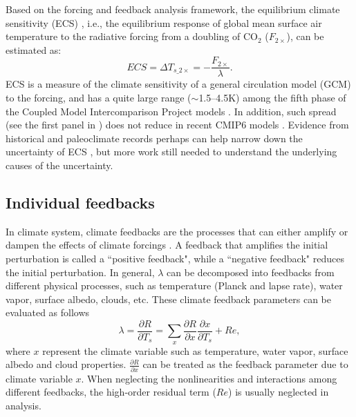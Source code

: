 Based on the forcing and feedback analysis framework, the equilibrium climate sensitivity (ECS) , i.e., the equilibrium response of global mean surface air temperature to the radiative forcing from a doubling of CO$_2$ ($F_{2\times}$), can be estimated as:
\begin{equation}
    ECS = \Delta T_{s\_2\times}=-\frac{F_{2\times}}{\lambda}.
    \label{eq:ecs}
\end{equation}
ECS is a measure of the climate sensitivity of a general circulation model (GCM) to the forcing, and has a quite large range ($\sim$1.5--4.5K) among the fifth phase of the Coupled Model Intercomparison Project \citep[CMIP5;][]{Taylor2012overview} models \citep[e.g.,][]{Andrews2012forcing,Ceppi2017}. In addition, such spread (see the first panel in ) does not reduce in recent CMIP6 \citep{Eyring2016overview} models  \citep{Zelinka2020causes}. Evidence from historical and paleoclimate records perhaps can help narrow down the uncertainty of ECS \citep{Sherwood2020}, but more work still needed to understand the underlying causes of the uncertainty.

\subsection{Individual feedbacks}
\label{sec:individual_fbks}

In climate system, climate feedbacks are the processes that can either amplify or dampen the effects of climate forcings \citep{Hansen1984}. A feedback that amplifies the initial perturbation is called a ``positive feedback", while a ``negative feedback" reduces the initial perturbation. In general, $\lambda$ can be decomposed into feedbacks from different physical processes, such as temperature (Planck and lapse rate), water vapor, surface albedo, clouds, etc. These climate feedback parameters can be evaluated as follows
\begin{equation}
    \lambda = \frac{\partial R}{\partial T_s} = \sum_x \frac{\partial R}{\partial x}\frac{\partial x}{\partial T_s} + Re, %
    \label{eq:lambda_sum}
\end{equation}
where $x$ represent the climate variable such as temperature, water vapor, surface albedo and cloud properties. $\frac{\partial R}{\partial x}$ can be treated as the feedback parameter due to climate variable $x$. When neglecting the nonlinearities and interactions among different feedbacks, the high-order residual term ($Re$) is usually neglected in analysis. 

